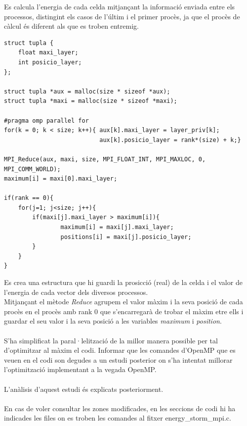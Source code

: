 \documentclass[a4paper, 11pt]{article}
\begin{document}
\vspace{2em}
Es calcula l'energia de cada celda mitjançant la informació enviada entre els processos, distingint els casos de l'últim i el primer procès, ja que el procès de càlcul és diferent als que es troben entremig.
\newpage 
\begin{lstlisting}[language = GERONA, firstnumber = 275]
struct tupla {
    float maxi_layer;
    int posicio_layer;
};

struct tupla *aux = malloc(size * sizeof *aux);
struct tupla *maxi = malloc(size * sizeof *maxi);

#pragma omp parallel for
for(k = 0; k < size; k++){ aux[k].maxi_layer = layer_priv[k]; 
                           aux[k].posicio_layer = rank*(size) + k;}

MPI_Reduce(aux, maxi, size, MPI_FLOAT_INT, MPI_MAXLOC, 0, MPI_COMM_WORLD);
maximum[i] = maxi[0].maxi_layer;

if(rank == 0){
    for(j=1; j<size; j++){
        if(maxi[j].maxi_layer > maximum[i]){
                maximum[i] = maxi[j].maxi_layer;
                positions[i] = maxi[j].posicio_layer;
        }
    }
}
\end{lstlisting}
Es crea una estructura que hi guardi la prosicció (real) de la celda i el valor de l'energia de cada vector dels diversos processos.\\
Mitjançant el mètode \textit{Reduce} agrupem el valor màxim i la seva posició de cada procès en el procès amb rank 0 que s'encarregarà de trobar el màxim etre ells i guardar el seu valor i la seva posició a les variables \textit{maximum} i \textit{position}.
\\\\
S'ha simplificat la paral·lelització de la millor manera possible per tal d'optimitzar al màxim el codi.
Informar que les comandes d'OpenMP que es veuen en el codi son degudes a un estudi posterior on s'ha intentat millorar l'optimització implementant a la vegada OpenMP.\\\\
L'anàlisis d'aquest estudi és explicats posteriorment.\\\\
En cas de voler consultar les zones modificades, en les seccions de codi hi ha indicades les files on es troben les comandes al fitxer \textcolor{darkpastelgreen}{energy\_storm\_mpi.c}.
\end{document}

